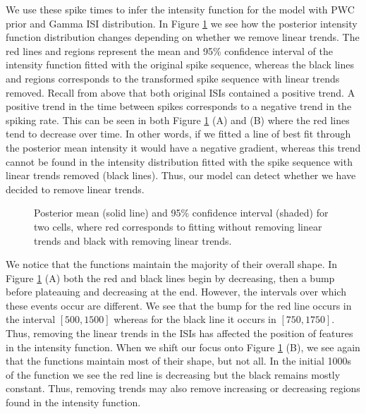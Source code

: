 \documentclass[../main.tex]{subfiles}
\begin{document}
We use these  spike times to infer the intensity function for the model with PWC prior and Gamma ISI distribution. In Figure \ref{fig:Trends} we see how the posterior intensity function distribution changes depending on whether we remove linear trends. The red lines and regions represent the mean and 95\% confidence interval of the intensity function fitted with the original  spike sequence, whereas the black lines and regions corresponds to the transformed  spike sequence with linear trends removed. Recall from above that both original ISIs contained a positive trend. A positive trend in the time between  spikes corresponds to a negative trend in the spiking rate. This can be seen in both Figure \ref{fig:Trends} (A) and (B) where the red lines tend to decrease over time. In other words, if we fitted a line of best fit through the posterior mean intensity it would have a negative gradient, whereas this trend cannot be found in the intensity distribution fitted with the  spike sequence with linear trends removed (black lines). Thus, our model can detect whether we have decided to remove linear trends.

 \begin{figure}[t!]
   \hrulefill
   \begin{center} 
     \quad
    \end{center}     
    \caption{Posterior mean (solid line) and 95\% confidence interval (shaded) for two cells, where red corresponds to fitting  without removing linear trends and black with removing linear trends.}
    \label{fig:Trends}
    \hrulefill
    \end{figure}
    
 We notice that the functions maintain the majority of their overall shape. In Figure \ref{fig:Trends} (A) both the red and black lines begin by decreasing, then a bump before plateauing and decreasing at the end. However, the intervals over which these events occur are different. We see that the bump for the red line  occurs in the interval $[500,1500]$ whereas for the black line it occurs in $[750,1750]$. Thus, removing the linear trends in the ISIs has affected the position of features in the intensity function. When we shift our focus onto Figure \ref{fig:Trends} (B), we see again that the functions maintain most of their shape, but not all. In the initial 1000s of the function we see the red line is decreasing but the black remains mostly constant. Thus, removing trends may also remove increasing or decreasing regions found in the intensity function.
 
\end{document}
